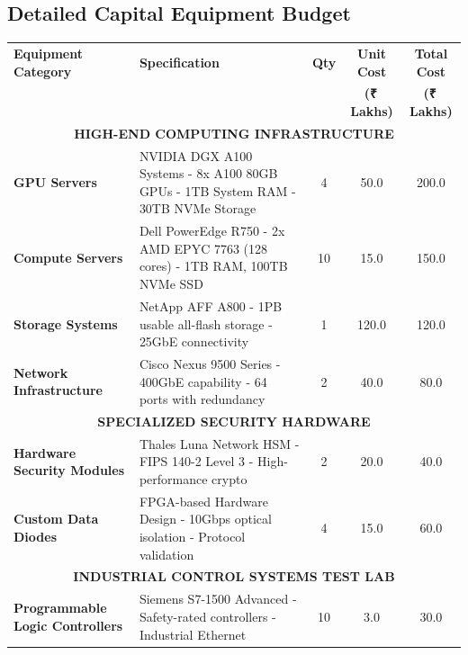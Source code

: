 \documentclass[12pt,a4paper]{article}
\newcommand{\rupees}{₹\,}
\begin{document}
\subsection{Detailed Capital Equipment Budget}

\begin{longtable}{|p{4cm}|p{6cm}|c|c|c|}
\hline
\rowcolor{lightblue}
\textbf{Equipment Category} & \textbf{Specification} & \textbf{Qty} & \textbf{Unit Cost} & \textbf{Total Cost} \\
& & & \textbf{(\rupees Lakhs)} & \textbf{(\rupees Lakhs)} \\
\hline
\endhead

\multicolumn{5}{|c|}{\cellcolor{gray}\textbf{HIGH-END COMPUTING INFRASTRUCTURE}} \\
\hline

\textbf{GPU Servers} & 
NVIDIA DGX A100 Systems
- 8x A100 80GB GPUs
- 1TB System RAM  
- 30TB NVMe Storage & 4 & 50.0 & 200.0 \\
\hline

\textbf{Compute Servers} & 
Dell PowerEdge R750
- 2x AMD EPYC 7763 (128 cores)
- 1TB RAM, 100TB NVMe SSD & 10 & 15.0 & 150.0 \\
\hline

\textbf{Storage Systems} & 
NetApp AFF A800
- 1PB usable all-flash storage
- 25GbE connectivity & 1 & 120.0 & 120.0 \\
\hline

\textbf{Network Infrastructure} & 
Cisco Nexus 9500 Series
- 400GbE capability
- 64 ports with redundancy & 2 & 40.0 & 80.0 \\
\hline

\multicolumn{5}{|c|}{\cellcolor{gray}\textbf{SPECIALIZED SECURITY HARDWARE}} \\
\hline

\textbf{Hardware Security Modules} & 
Thales Luna Network HSM
- FIPS 140-2 Level 3
- High-performance crypto & 2 & 20.0 & 40.0 \\
\hline

\textbf{Custom Data Diodes} & 
FPGA-based Hardware Design
- 10Gbps optical isolation
- Protocol validation & 4 & 15.0 & 60.0 \\
\hline

\multicolumn{5}{|c|}{\cellcolor{gray}\textbf{INDUSTRIAL CONTROL SYSTEMS TEST LAB}} \\
\hline

\textbf{Programmable Logic Controllers} & 
Siemens S7-1500 Advanced
- Safety-rated controllers
- Industrial Ethernet & 10 & 3.0 & 30.0 \\
\hline


\end{longtable}
\end{document}
